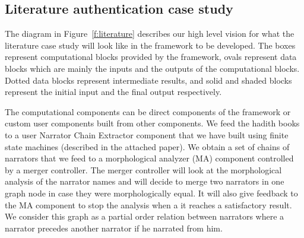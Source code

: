 \documentclass[12pt]{article}
\begin{document}
\subsection{Literature authentication case study}
\label{s:design:lit}

\begin{figure}
\end{figure}

The diagram in Figure~\ref{f:literature} describes our 
high level vision for what the literature case study
will look like in the framework to be developed. 
The boxes represent 
computational blocks provided by the framework, 
ovals represent data blocks which are mainly the 
inputs and the outputs of the computational blocks. 
Dotted data blocks represent intermediate results,
and solid and shaded blocks represent the initial input 
and the final output respectively. 

The computational components can be direct components of the framework
or custom user components built from other components.
We feed the hadith books to a user Narrator Chain Extractor
component that we have built using finite state machines (described in the attached paper).
We  obtain a set of chains
of narrators that we feed to a morphological analyzer (MA) 
component controlled by a merger controller. 
The merger controller will look at the morphological analysis
of the narrator names and will decide to merge two narrators in 
one graph node in case they were morphologically equal. 
It will also give feedback to the MA component to stop the
analysis when a it reaches a satisfactory result.
We consider this graph as a partial order relation between 
narrators where a narrator precedes another narrator if 
he narrated from him. 
\end{document}
